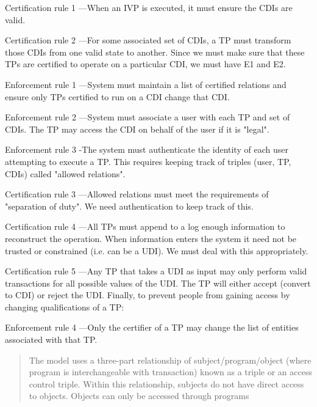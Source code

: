 \documentclass[Screen16to9,17pt]{foils}
\begin{document}
\begin{list22}
\item[Certification rule 1] —When an IVP is executed, it must ensure the CDIs are valid.
\item[Certification rule 2] —For some associated set of CDIs, a TP must transform those CDIs from one valid state to another.
Since we must make sure that these TPs are certified to operate on a particular CDI, we must have E1 and E2.

\item[Enforcement rule 1] —System must maintain a list of certified relations and ensure only TPs certified to run on a CDI change that CDI.
\item[Enforcement rule 2] —System must associate a user with each TP and set of CDIs. The TP may access the CDI on behalf of the user if it is "legal".
\item[Enforcement rule 3] -The system must authenticate the identity of each user attempting to execute a TP.
This requires keeping track of triples (user, TP, {CDIs}) called "allowed relations".

\item[Certification rule 3] —Allowed relations must meet the requirements of "separation of duty".
We need authentication to keep track of this.

\item[Certification rule 4] —All TPs must append to a log enough information to reconstruct the operation.
When information enters the system it need not be trusted or constrained (i.e. can be a UDI). We must deal with this appropriately.

\item[Certification rule 5] —Any TP that takes a UDI as input may only perform valid transactions for all possible values of the UDI. The TP will either accept (convert to CDI) or reject the UDI.
Finally, to prevent people from gaining access by changing qualifications of a TP:

\item[Enforcement rule 4] —Only the certifier of a TP may change the list of entities associated with that TP.
\end{list22}



\begin{quote}
The model uses a three-part relationship of subject/program/object (where program is interchangeable with transaction) known as a triple or an access control triple. Within this relationship, subjects do not have direct access to objects. Objects can only be accessed through programs
\end{quote}
\end{document}
